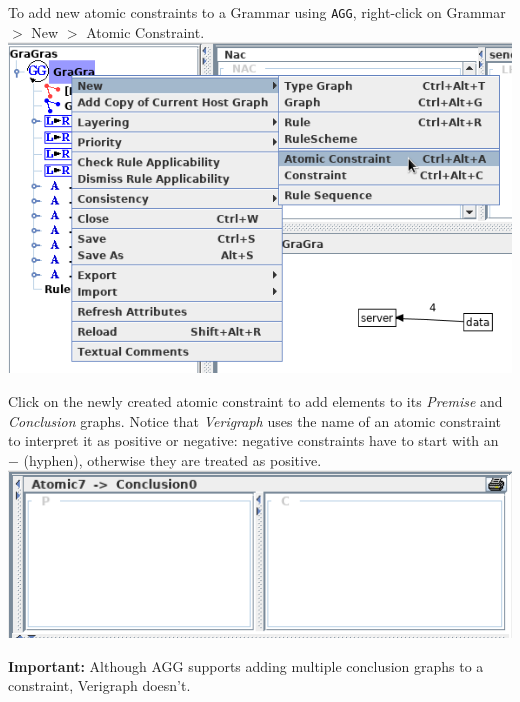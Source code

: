 \documentclass[12pt]{article}
\newenvironment{tutorialstep}
	{\hspace{-\parindent}\begin{minipage}{\textwidth}}
    {\vspace{.3cm}\end{minipage}}
\begin{document}
\begin{tutorialstep}
To add new atomic constraints to a Grammar using \texttt{AGG}, right-click on Grammar $>$ New $>$ Atomic Constraint. \\

  \noindent
  \centering
  \includegraphics[scale = 0.6]{img/concurrent-rules/atomic_constraints01.png}
\end{tutorialstep}

\begin{tutorialstep}
Click on the newly created atomic constraint to add elements to its \emph{Premise} and \emph{Conclusion} graphs. Notice that  \emph{Verigraph} uses the name of an atomic constraint to interpret it as positive or negative: negative constraints have to start with an $-$ (hyphen), otherwise they are treated as positive. \\

  \noindent
  \centering
  \includegraphics[scale = 0.6]{img/concurrent-rules/new_atomic}
  
\end{tutorialstep}

\pagebreak
\noindent
\textbf{Important:} Although AGG supports adding multiple conclusion graphs to a constraint, Verigraph doesn't.\\
\end{document}

